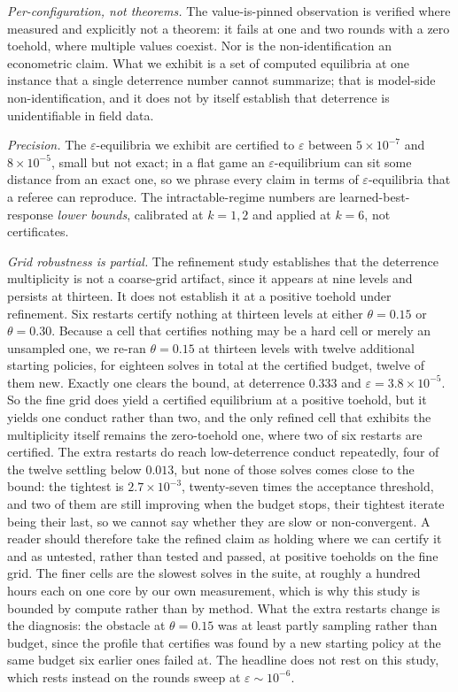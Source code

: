 \documentclass[11pt,a4paper]{article}
\newcommand{\theold}{\theta}   %
\begin{document}
\emph{Per-configuration, not theorems.} The value-is-pinned observation is verified where measured and explicitly not a theorem: it fails at one and two rounds with a zero toehold, where multiple values coexist. Nor is the non-identification an econometric claim. What we exhibit is a set of computed equilibria at one instance that a single deterrence number cannot summarize; that is model-side non-identification, and it does not by itself establish that deterrence is unidentifiable in field data.

\emph{Precision.} The $\varepsilon$-equilibria we exhibit are certified to $\varepsilon$ between $5\times10^{-7}$ and $8\times10^{-5}$, small but not exact; in a flat game an $\varepsilon$-equilibrium can sit some distance from an exact one, so we phrase every claim in terms of $\varepsilon$-equilibria that a referee can reproduce. The intractable-regime numbers are learned-best-response \emph{lower bounds}, calibrated at $k=1,2$ and applied at $k=6$, not certificates.

\emph{Grid robustness is partial.} The refinement study establishes that the deterrence multiplicity is not a coarse-grid artifact, since it appears at nine levels and persists at thirteen. It does not establish it at a positive toehold under refinement. Six restarts certify nothing at thirteen levels at either $\theold=0.15$ or $\theold=0.30$. Because a cell that certifies nothing may be a hard cell or merely an unsampled one, we re-ran $\theold=0.15$ at thirteen levels with twelve additional starting policies, for eighteen solves in total at the certified budget, twelve of them new. Exactly one clears the bound, at deterrence $0.333$ and $\varepsilon=3.8\times10^{-5}$. So the fine grid does yield a certified equilibrium at a positive toehold, but it yields one conduct rather than two, and the only refined cell that exhibits the multiplicity itself remains the zero-toehold one, where two of six restarts are certified. The extra restarts do reach low-deterrence conduct repeatedly, four of the twelve settling below $0.013$, but none of those solves comes close to the bound: the tightest is $2.7\times10^{-3}$, twenty-seven times the acceptance threshold, and two of them are still improving when the budget stops, their tightest iterate being their last, so we cannot say whether they are slow or non-convergent. A reader should therefore take the refined claim as holding where we can certify it and as untested, rather than tested and passed, at positive toeholds on the fine grid. The finer cells are the slowest solves in the suite, at roughly a hundred hours each on one core by our own measurement, which is why this study is bounded by compute rather than by method. What the extra restarts change is the diagnosis: the obstacle at $\theold=0.15$ was at least partly sampling rather than budget, since the profile that certifies was found by a new starting policy at the same budget six earlier ones failed at. The headline does not rest on this study, which rests instead on the rounds sweep at $\varepsilon\sim10^{-6}$.
\end{document}

